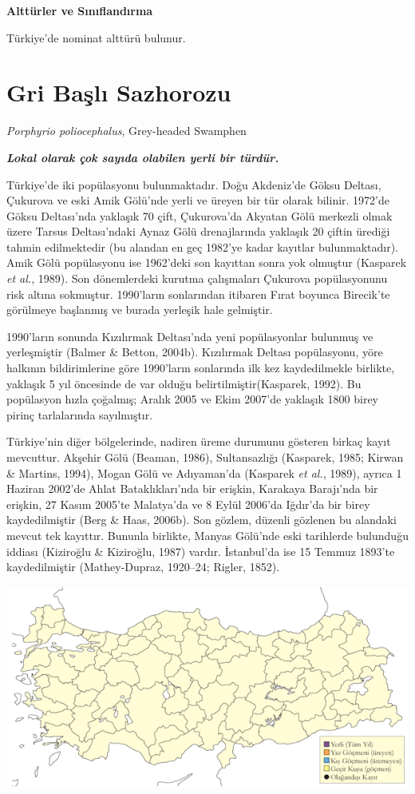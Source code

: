 \documentclass[
  a4paper,
  DIV=11,
  numbers=noendperiod]{scrreprt}
\begin{document}
\textbf{Alttürler ve Sınıflandırma}

Türkiye'de nominat alttürü bulunur.

\section{Gri Başlı Sazhorozu}\label{gri-baux15flux131-sazhorozu}

\emph{Porphyrio poliocephalus}, Grey-headed Swamphen

\textbf{\emph{Lokal olarak çok sayıda olabilen yerli bir türdür.}}

Türkiye'de iki popülasyonu bulunmaktadır. Doğu Akdeniz'de Göksu Deltası,
Çukurova ve eski Amik Gölü'nde yerli ve üreyen bir tür olarak bilinir.
1972'de Göksu Deltası'nda yaklaşık 70 çift, Çukurova'da Akyatan Gölü
merkezli olmak üzere Tarsus Deltası'ndaki Aynaz Gölü drenajlarında
yaklaşık 20 çiftin ürediği tahmin edilmektedir (bu alandan en geç
1982'ye kadar kayıtlar bulunmaktadır). Amik Gölü popülasyonu ise
1962'deki son kayıttan sonra yok olmuştur (Kasparek \emph{et al.},
1989). Son dönemlerdeki kurutma çalışmaları Çukurova popülasyonunu risk
altına sokmuştur. 1990'ların sonlarından itibaren Fırat boyunca
Birecik'te görülmeye başlanmış ve burada yerleşik hale gelmiştir.

1990'ların sonunda Kızılırmak Deltası'nda yeni popülasyonlar bulunmuş ve
yerleşmiştir (Balmer \& Betton, 2004b). Kızılırmak Deltası popülasyonu,
yöre halkının bildirimlerine göre 1990'ların sonlarında ilk kez
kaydedilmekle birlikte, yaklaşık 5 yıl öncesinde de var olduğu
belirtilmiştir(Kasparek, 1992). Bu popülasyon hızla çoğalmış; Aralık
2005 ve Ekim 2007'de yaklaşık 1800 birey pirinç tarlalarında
sayılmıştır.

Türkiye'nin diğer bölgelerinde, nadiren üreme durumunu gösteren birkaç
kayıt mevcuttur. Akşehir Gölü (Beaman, 1986), Sultansazlığı (Kasparek,
1985; Kirwan \& Martins, 1994), Mogan Gölü ve Adıyaman'da (Kasparek
\emph{et al.}, 1989), ayrıca 1 Haziran 2002'de Ahlat Bataklıkları'nda
bir erişkin, Karakaya Barajı'nda bir erişkin, 27 Kasım 2005'te
Malatya'da ve 8 Eylül 2006'da Iğdır'da bir birey kaydedilmiştir (Berg \&
Haas, 2006b). Son gözlem, düzenli gözlenen bu alandaki mevcut tek
kayıttır. Bununla birlikte, Manyas Gölü'nde eski tarihlerde bulunduğu
iddiası (Kiziroğlu \& Kiziroğlu, 1987) vardır. İstanbul'da ise 15 Temmuz
1893'te kaydedilmiştir (Mathey-Dupraz, 1920--24; Rigler, 1852).

\includegraphics{images/harita_Page_120.png}
\end{document}
